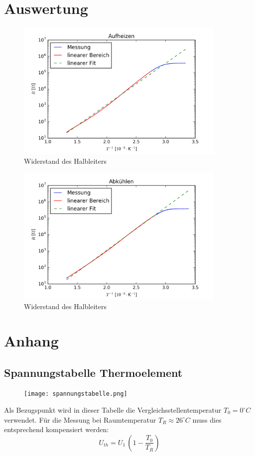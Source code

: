 \documentclass[a4paper]{scrartcl}
\begin{document}
\section{Auswertung}
%
\begin{figure}[htbp]
\centering
\includegraphics[width=0.9\textwidth]{temp_heat.png}
\caption{Widerstand des Halbleiters}
\label{temp_heat}
\end{figure}
%
%
\begin{figure}[htbp]
\centering
\includegraphics[width=0.9\textwidth]{temp_cool.png}
\caption{Widerstand des Halbleiters}
\label{temp_cool}
\end{figure}
%

\newpage
\section{Anhang}
\subsection{Spannungstabelle Thermoelement}
\begin{figure}[htbp]
\centering
\texttt{[image: spannungstabelle.png]}
\label{temp_cool}
\end{figure}
%
Als Bezugspunkt wird in dieser Tabelle die Vergleichsstellentemperatur $T_{0}=0^{\circ}C$ verwendet. Für die Messung bei Raumtemperatur $T_{R} \approx 26^{\circ}C$ muss dies entsprechend kompensiert werden:
$$ U_{th} = U_{1} \, (1-\frac{T_{0}}{T_{R}}) $$
\end{document}
